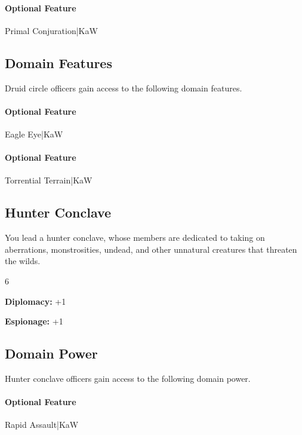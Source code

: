 \documentclass[10pt,a4paper,twoside,bg=print,twocolumn,openany,nodeprecatedcode]{dndbook}
\begin{document}
\paragraph{Optional Feature}
Primal Conjuration|KaW

\subsection{Domain Features}
Druid circle officers gain access to the following domain features.

\paragraph{Optional Feature}
Eagle Eye|KaW

\paragraph{Optional Feature}
Torrential Terrain|KaW

\subsection{Hunter Conclave}
You lead a hunter conclave, whose members are dedicated to taking on aberrations, monstrosities, undead, and other unnatural creatures that threaten the wilds.

{\par \vspace { 9pt plus 3pt minus 3pt } \noindent  {} \nopagebreak }

\begin{itemize}
\begin{multicols}{6}
\item \textbf{Diplomacy:} +1
\item \textbf{Espionage:} +1
\end{multicols}

\end{itemize}

\subsection{Domain Power}
Hunter conclave officers gain access to the following domain power.

\paragraph{Optional Feature}
Rapid Assault|KaW
\end{document}
